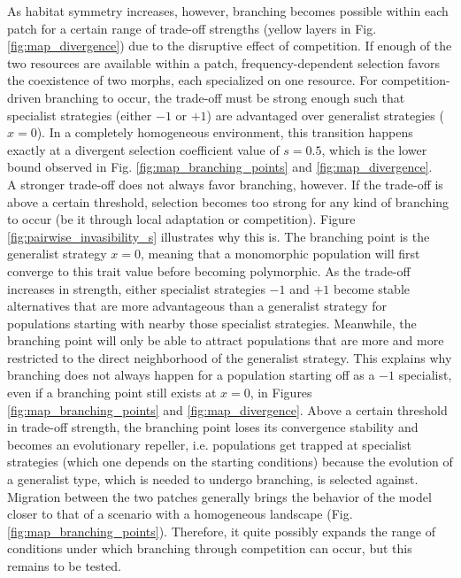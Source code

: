 As habitat symmetry increases, however, branching becomes possible within each patch for a certain range of trade-off strengths (yellow layers in Fig. \ref{fig:map_divergence}) due to the disruptive effect of competition. If enough of the two resources are available within a patch, frequency-dependent selection favors the coexistence of two morphs, each specialized on one resource. For competition-driven branching to occur, the trade-off must be strong enough such that specialist strategies (either $-1$ or $+1$) are advantaged over generalist strategies ($x = 0$). In a completely homogeneous environment, this transition happens exactly at a divergent selection coefficient value of $s = 0.5$, which is the lower bound observed in Fig. \ref{fig:map_branching_points} and \ref{fig:map_divergence}.\\

A stronger trade-off does not always favor branching, however. If the trade-off is above a certain threshold, selection becomes too strong for any kind of branching to occur (be it through local adaptation or competition). Figure \ref{fig:pairwise_invasibility_s} illustrates why this is. The branching point is the generalist strategy $x = 0$, meaning that a monomorphic population will first converge to this trait value before becoming polymorphic. As the trade-off increases in strength, either specialist strategies $-1$ and $+1$ become stable alternatives that are more advantageous than a generalist strategy for populations starting with nearby those specialist strategies. Meanwhile, the branching point will only be able to attract populations that are more and more restricted to the direct neighborhood of the generalist strategy. This explains why branching does not always happen for a population starting off as a $-1$ specialist, even if a branching point still exists at $x = 0$, in Figures \ref{fig:map_branching_points} and \ref{fig:map_divergence}. Above a certain threshold in trade-off strength, the branching point loses its convergence stability and becomes an evolutionary repeller, i.e. populations get trapped at specialist strategies (which one depends on the starting conditions) because the evolution of a generalist type, which is needed to undergo branching, is selected against.\\

Migration between the two patches generally brings the behavior of the model closer to that of a scenario with a homogeneous landscape (Fig. \ref{fig:map_branching_points}). Therefore, it quite possibly expands the range of conditions under which branching through competition can occur, but this remains to be tested.

